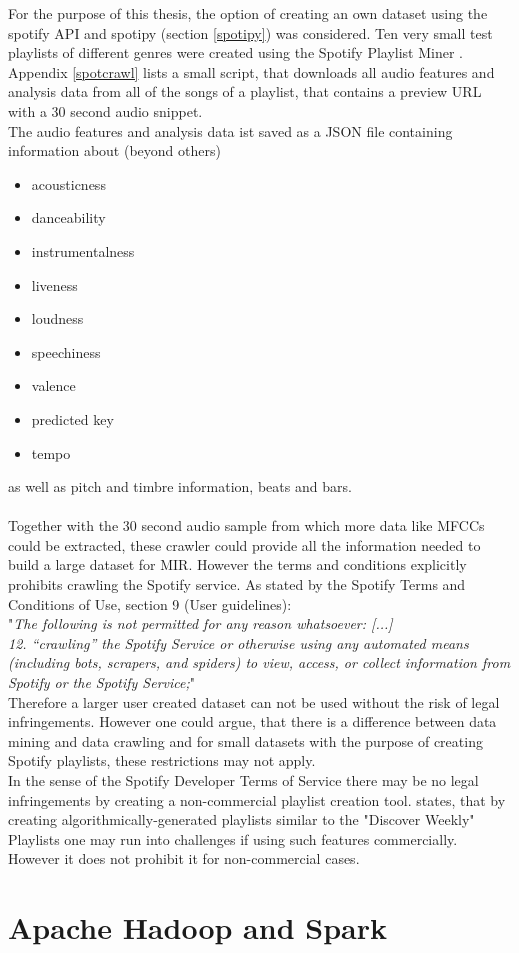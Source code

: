For the purpose of this thesis, the option of creating an own dataset using the spotify API and spotipy (section \ref{spotipy}) was considered. 
Ten very small test playlists of different genres were created using the Spotify Playlist Miner \cite{spotmin1}. 
Appendix \ref{spotcrawl} lists a small script, that downloads all audio features and analysis data from all of the songs of a playlist, that contains a preview URL with a 30 second audio snippet.\\
The audio features and analysis data ist saved as a JSON file containing information about (beyond others)

\begin{itemize}
	\setlength\itemsep{0em}
	\item acousticness
	\item danceability
	\item instrumentalness
	\item liveness
	\item loudness
	\item speechiness
	\item valence
	\item predicted key
	\item tempo 
\end{itemize}

as well as pitch and timbre information, beats and bars.\\
\ \\
Together with the 30 second audio sample from which more data like MFCCs could be extracted, these crawler could provide all the information needed to build a large dataset for MIR. However the terms and conditions explicitly prohibits crawling the Spotify service. As stated by the Spotify Terms and Conditions of Use, section 9 (User guidelines):\\
"\textit{The following is not permitted for any reason whatsoever: [...]\\
12. “crawling” the Spotify Service or otherwise using any automated means (including bots, scrapers, and spiders) to view, access, or collect information from Spotify or the Spotify Service;}" \cite{spottac1}\\
Therefore a larger user created dataset can not be used without the risk of legal infringements. However one could argue, that there is a difference between data mining and data crawling and for small datasets with the purpose of creating Spotify playlists, these restrictions may not apply.\\ 
In the sense of the Spotify Developer Terms of Service \cite{spottac2} there may be no legal infringements by creating a non-commercial playlist creation tool. \cite{spottac3} states, that by creating algorithmically-generated playlists similar to the "Discover Weekly" Playlists one may run into challenges if using such features commercially. 
However it does not prohibit it for non-commercial cases.  


\section{Apache Hadoop and Spark}